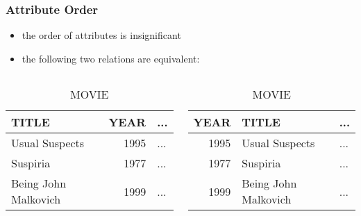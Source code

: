 \documentclass[dvipsnames]{beamer}
\theoremstyle{plain}
\begin{document}
\begin{frame}
  \frametitle{Attribute Order}

  \begin{itemize}
    \item the order of attributes is insignificant
  \end{itemize}

  \pause
  \begin{example}
    \begin{itemize}
      \item the following two relations are equivalent:
    \end{itemize}

    \begin{columns}
      \begin{tiny}
      \begin{table}
        \caption{MOVIE}
        \begin{tabular}{|l|r|l|}\hline
TITLE                & YEAR & ...\\\hline\hline
Usual Suspects       & 1995 & ...\\\hline
Suspiria             & 1977 & ...\\\hline
Being John Malkovich & 1999 & ...\\\hline
        \end{tabular}
      \end{table}
      \end{tiny}

      \begin{tiny}
      \begin{table}
        \caption{MOVIE}
        \begin{tabular}{|r|l|l|}\hline
YEAR & TITLE                & ...\\\hline\hline
1995 & Usual Suspects       & ...\\\hline
1977 & Suspiria             & ...\\\hline
1999 & Being John Malkovich & ...\\\hline
        \end{tabular}
      \end{table}
      \end{tiny}
    \end{columns}
  \end{example}
\end{frame}
\end{document}
